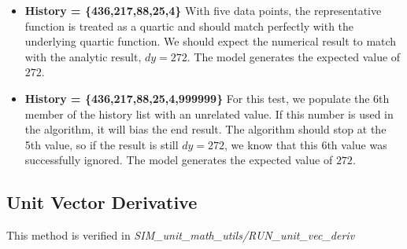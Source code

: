 \documentclass[11pt,fleqn]{report}
\begin{document}
\begin{itemize}
\begin{itemize}
$(3ax^2 + 2bx + c) = 219 +(3ax-a+b)$.
\item the second difference yields $(3ax-a+b) = 45+2a$.
\item the third difference yields $a=4$.
\end{itemize}
Thus
$f'(x) = 3ax^2 + 2bx + c = 219 + (45 + 2(4)) = 272$.\newline
The model generates a value of 271.9999999999999.
\item \textbf{History = \{436,217,88,25,4\}} With five data points, the
representative function is treated as a quartic and should match
perfectly with the underlying quartic function.
We should expect the numerical result to match with the analytic
result, $dy = 272$.
The model generates the expected value of $272$.
\item \textbf{History = \{436,217,88,25,4,999999\}} For this test, we
populate the 6th member of the history list with an unrelated value.
If this number is used in the algorithm, it will bias the end
result. The algorithm should stop at the 5th value, so if the result
is still $dy = 272$, we know that this 6th value was successfully
ignored.
The model generates the expected value of $272$.
\end{itemize}



\subsection{Unit Vector Derivative}
This method is verified in
\textit{SIM\_unit\_math\_utils/RUN\_unit\_vec\_deriv}
\end{document}
